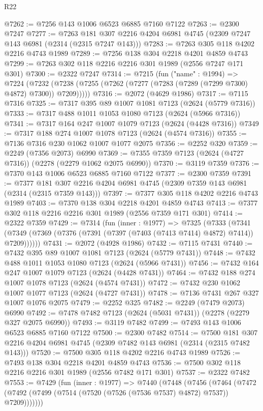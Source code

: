 \begin{lexlean}{R22}
\begin{coremodule}
@7262 := @7256 @143 @1006 @6523 @6885 @7160 @7122
@7263 := @2300 @7247
@7277 := @7263 @181 @307 @2216 @4204 @6981 @4745 (@2309 @7247 @143 @6981 (@2314 (@2315 @7247 @143)))
@7283 := @7263 @305 @118 @4202 @2216 @4743 @1989
@7289 := @7256 @138 @304 @2218 @4201 @4859 @4743
@7299 := @7263 @302 @118 @2216 @2216 @301 @1989 (@2556 @7247 @171 @301)
@7300 := @2322 @7247
@7314 := @7215
    (fun ("name" : @1994) =>
    @7224 (@7232 (@7238 (@7255 (@7262 (@7277 (@7283 (@7289 (@7299 @7300) @4872) @7300)) @7209)))))
@7316 := @2072 (@4629 @1986)
@7317 := @7115 @7316
@7325 := @7317 @395 @89 @1007 @1081 @7123 (@2624 (@5779 @7316))
@7333 := @7317 @488 @1011 @1053 @1080 @7123 (@2624 (@5966 @7316))
@7341 := @7317 @164 @247 @1007 @1079 @7123 (@2624 (@4428 @7316))
@7349 := @7317 @188 @274 @1007 @1078 @7123 (@2624 (@4574 @7316))
@7355 := @7136 @7316 @230 @1062 @1007 @1077 @2075
@7356 := @2252 @320
@7359 := @2249 (@7356 @2073) @6990
@7369 := @7355 @7359 @7123 (@2624 (@4727 @7316)) (@2278 (@2279 @1062 @2075 @6990))
@7370 := @3119 @7359
@7376 := @7370 @143 @1006 @6523 @6885 @7160 @7122
@7377 := @2300 @7359
@7391 := @7377 @181 @307 @2216 @4204 @6981 @4745 (@2309 @7359 @143 @6981 (@2314 (@2315 @7359 @143)))
@7397 := @7377 @305 @118 @4202 @2216 @4743 @1989
@7403 := @7370 @138 @304 @2218 @4201 @4859 @4743
@7413 := @7377 @302 @118 @2216 @2216 @301 @1989 (@2556 @7359 @171 @301)
@7414 := @2322 @7359
@7429 := @7314
    (fun (inner : @1977) =>
    @7325
      (@7333
        (@7341 (@7349 (@7369 (@7376 (@7391 (@7397 (@7403 (@7413 @7414) @4872) @7414)) @7209))))))
@7431 := @2072 (@4928 @1986)
@7432 := @7115 @7431
@7440 := @7432 @395 @89 @1007 @1081 @7123 (@2624 (@5779 @7431))
@7448 := @7432 @488 @1011 @1053 @1080 @7123 (@2624 (@5966 @7431))
@7456 := @7432 @164 @247 @1007 @1079 @7123 (@2624 (@4428 @7431))
@7464 := @7432 @188 @274 @1007 @1078 @7123 (@2624 (@4574 @7431))
@7472 := @7432 @230 @1062 @1007 @1077 @7123 (@2624 (@4727 @7431))
@7478 := @7136 @7431 @267 @327 @1007 @1076 @2075
@7479 := @2252 @325
@7482 := @2249 (@7479 @2073) @6990
@7492 := @7478 @7482 @7123 (@2624 (@5031 @7431)) (@2278 (@2279 @327 @2075 @6990))
@7493 := @3119 @7482
@7499 := @7493 @143 @1006 @6523 @6885 @7160 @7122
@7500 := @2300 @7482
@7514 := @7500 @181 @307 @2216 @4204 @6981 @4745 (@2309 @7482 @143 @6981 (@2314 (@2315 @7482 @143)))
@7520 := @7500 @305 @118 @4202 @2216 @4743 @1989
@7526 := @7493 @138 @304 @2218 @4201 @4859 @4743
@7536 := @7500 @302 @118 @2216 @2216 @301 @1989 (@2556 @7482 @171 @301)
@7537 := @2322 @7482
@7553 := @7429
    (fun (inner : @1977) =>
    @7440
      (@7448
        (@7456
          (@7464 (@7472 (@7492 (@7499 (@7514 (@7520 (@7526 (@7536 @7537) @4872) @7537)) @7209)))))))

\end{coremodule}
\end{lexlean}

